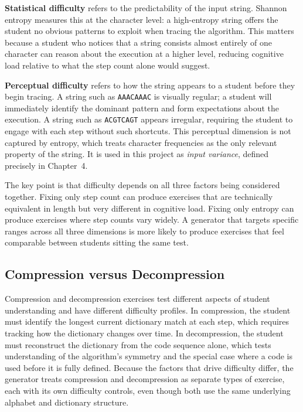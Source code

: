 \documentclass{l4proj}
\begin{document}
\textbf{Statistical difficulty} refers to the predictability of the input string. Shannon entropy \citep{Shannon48} measures this at the character level: a high-entropy string offers the student no obvious patterns to exploit when tracing the algorithm. This matters because a student who notices that a string consists almost entirely of one character can reason about the execution at a higher level, reducing cognitive load relative to what the step count alone would suggest.

\textbf{Perceptual difficulty} refers to how the string appears to a student before they begin tracing. A string such as \texttt{AAACAAAC} is visually regular; a student will immediately identify the dominant pattern and form expectations about the execution. A string such as \texttt{ACGTCAGT} appears irregular, requiring the student to engage with each step without such shortcuts. This perceptual dimension is not captured by entropy, which treats character frequencies as the only relevant property of the string. It is used in this project as \emph{input variance}, defined precisely in Chapter~4.

The key point is that difficulty depends on all three factors being considered together. Fixing only step count can produce exercises that are technically equivalent in length but very different in cognitive load. Fixing only entropy can produce exercises where step counts vary widely. A generator that targets specific ranges across all three dimensions is more likely to produce exercises that feel comparable between students sitting the same test.

\subsection{Compression versus Decompression}

Compression and decompression exercises test different aspects of student understanding and have different difficulty profiles. In compression, the student must identify the longest current dictionary match at each step, which requires tracking how the dictionary changes over time. In decompression, the student must reconstruct the dictionary from the code sequence alone, which tests understanding of the algorithm's symmetry and the special case where a code is used before it is fully defined. Because the factors that drive difficulty differ, the generator treats compression and decompression as separate types of exercise, each with its own difficulty controls, even though both use the same underlying alphabet and dictionary structure.
\end{document}
